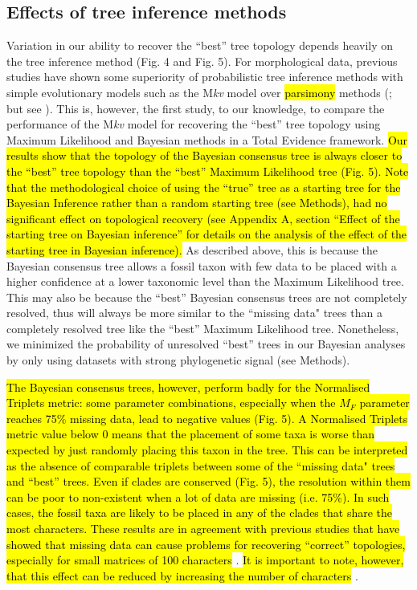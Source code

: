 \documentclass[12pt,letterpaper]{article}
\begin{document}
\subsection{Effects of tree inference methods}
Variation in our ability to recover the ``best'' tree topology depends heavily on the tree inference method (Fig. 4 and Fig. 5).
For morphological data, previous studies have shown some superiority of probabilistic tree inference methods with simple evolutionary models such as the M\textit{kv} model \citep{lewisa2001} over \hl{parsimony} methods (\citealp{wrightbayesian2014}; but see \citealp{spencerefficacy2013}).
This is, however, the first study, to our knowledge, to compare the performance of the M\textit{kv} model \citep{lewisa2001} for recovering the ``best'' tree topology using Maximum Likelihood and Bayesian methods in a Total Evidence framework.
\hl{Our results show that the topology of the Bayesian consensus tree is always closer to the ``best'' tree topology than the ``best'' Maximum Likelihood tree (Fig. 5).
Note that the methodological choice of using the ``true'' tree as a starting tree for the Bayesian Inference rather than a random starting tree (see Methods), had no significant effect on topological recovery (see Appendix A, section ``Effect of the starting tree on Bayesian inference'' for details on the analysis of the effect of the starting tree in Bayesian inference).}
As described above, this is because the Bayesian consensus tree allows a fossil taxon with few data to be placed with a higher confidence at a lower taxonomic level than the Maximum Likelihood tree.
This may also be because the ``best'' Bayesian consensus trees are not completely resolved, thus will always be more similar to the ``missing data" trees than a completely resolved tree like the ``best'' Maximum Likelihood tree.
Nonetheless, we minimized the probability of unresolved ``best'' trees in our Bayesian analyses by only using datasets with strong phylogenetic signal (see Methods).

\hl{The Bayesian consensus trees, however, perform badly for the Normalised Triplets metric: some parameter combinations, especially when the $M_F$ parameter reaches 75\% missing data, lead to negative values (Fig. 5).
A Normalised Triplets metric value below 0 means that the placement of some taxa is worse than expected by just randomly placing this taxon in the tree.
This can be interpreted as the absence of comparable triplets between some of the ``missing data" trees and ``best'' trees.
Even if clades are conserved (Fig. 5), the resolution within them can be poor to non-existent when a lot of data are missing (i.e. 75\%).
In such cases, the fossil taxa are likely to be placed in any of the clades that share the most characters.
These results are in agreement with previous studies that have showed that missing data can cause problems for recovering ``correct'' topologies, especially for small matrices of 100 characters }\citep{wiensmissing2003}.
\hl{It is important to note, however, that this effect can be reduced by increasing the number of characters }\citep{wiensmissing2003}.
\end{document}
